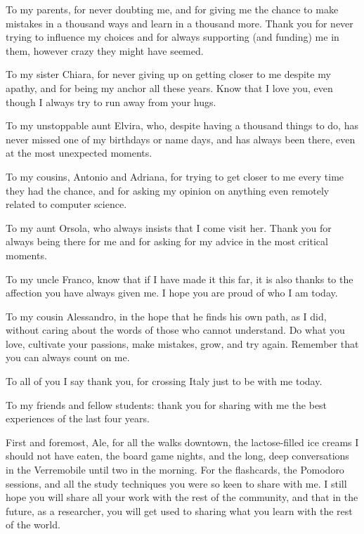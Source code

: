 \acknowledgements
To my parents, for never doubting me, and for giving me the chance to make mistakes in a thousand ways 
and learn in a thousand more.
Thank you for never trying to influence my choices and for always supporting (and funding) me in them, 
however crazy they might have seemed. 

To my sister Chiara, for never giving up on getting closer to me despite my apathy, and for being my anchor 
all these years. 
Know that I love you, even though I always try to run away from your hugs. 

To my unstoppable aunt Elvira, who, despite having a thousand things to do, has never missed one of my birthdays or name days, 
and has always been there, even at the most unexpected moments. 

To my cousins, Antonio and Adriana, for trying to get closer to me every time they had the chance, and for 
asking my opinion on anything even remotely related to computer science. 

To my aunt Orsola, who always insists that I come visit her. Thank you for always being there for me and for asking for my 
advice in the most critical moments.

To my uncle Franco, know that if I have made it this far, it is also thanks to the affection you have always given me.
I hope you are proud of who I am today.

To my cousin Alessandro, in the hope that he finds his own path, as I did, without caring about the words of those who cannot understand.
Do what you love, cultivate your passions, make mistakes, grow, and try again. Remember that you can always count on me.

To all of you I say thank you, for crossing Italy just to be with me today.

\clearpage

To my friends and fellow students:
thank you for sharing with me the best experiences of the last four years.

First and foremost, Ale, for all the walks downtown, the lactose-filled ice creams I should not have eaten, the board game 
nights, and the long, deep conversations in the Verremobile until two in the morning.
For the flashcards, the Pomodoro sessions, and all the study techniques you were so keen to share with me.
I still hope you will share all your work with the rest of the community, and that in the future, as a researcher, you will get used to 
sharing what you learn with the rest of the world. 

